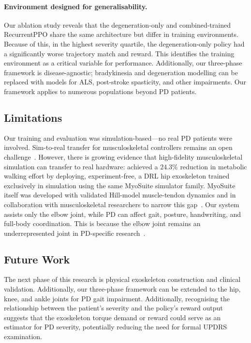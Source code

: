 \documentclass[letterpaper]{article} %
\begin{document}
\paragraph{Environment designed for generalisability.}
Our ablation study reveals that the degeneration-only and combined-trained
RecurrentPPO share the same architecture but differ in training environments.
Because of this, in the highest severity quartile, the degeneration-only policy
had a significantly worse trajectory match and reward.
This identifies the training environment as a critical variable for performance.
Additionally, our three-phase framework is disease-agnostic; bradykinesia and
degeneration modelling can be replaced with models for ALS, post-stroke
spasticity, and other impairments.
Our framework applies to numerous populations beyond PD patients.

\subsection{Limitations}

Our training and evaluation was simulation-based---no real PD patients were
involved.
Sim-to-real transfer for musculoskeletal controllers remains an open
challenge~\citep{luo2025}.
However, there is growing evidence that high-fidelity musculoskeletal simulation
can transfer to real hardware: \citet{luo2024} achieved a $24.3\%$ reduction in
metabolic walking effort by deploying, experiment-free, a DRL hip exoskeleton
trained exclusively in simulation using the same MyoSuite simulator family.
MyoSuite itself was developed with validated Hill-model muscle-tendon dynamics
and in collaboration with musculoskeletal researchers to narrow this
gap~\citep{caggiano2022}.
Our system assists only the elbow joint, while PD can affect gait, posture,
handwriting, and full-body coordination.
This is because the elbow joint remains an underrepresented joint in PD-specific
research~\citep{capato2023}.

\subsection{Future Work}

The next phase of this research is physical exoskeleton construction and clinical
validation.
Additionally, our three-phase framework can be extended to the hip, knee, and
ankle joints for PD gait impairment.
Additionally, recognising the relationship between the patient's severity and
the policy's reward output suggests that the exoskeleton torque demand or reward
could serve as an estimator for PD severity, potentially reducing the need for
formal UPDRS examination.
\end{document}

